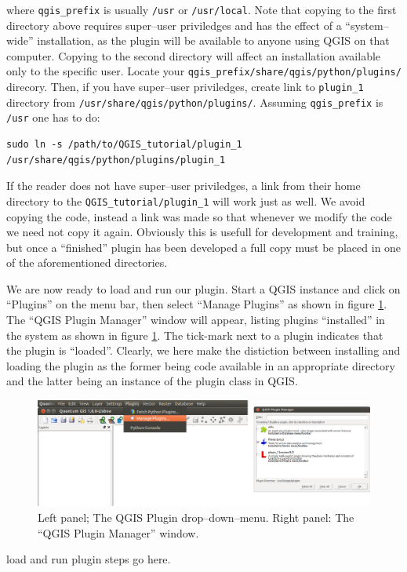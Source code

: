 where  \lstinline{qgis_prefix} is usually \lstinline{/usr} or \lstinline{/usr/local}. Note that copying to the first directory above requires super--user priviledges and has the effect of a ``system--wide'' installation, as the plugin will be available to anyone using QGIS on that computer. Copying to the second directory will affect an installation available only to the specific user. Locate your \lstinline{qgis_prefix/share/qgis/python/plugins/} direcory. Then, if you have super--user priviledges, create link to \lstinline{plugin_1} directory from \lstinline{/usr/share/qgis/python/plugins/}. Assuming \lstinline{qgis_prefix} is \lstinline{/usr} one has to do:
\begin{lstlisting}
sudo ln -s /path/to/QGIS_tutorial/plugin_1 /usr/share/qgis/python/plugins/plugin_1
\end{lstlisting}
If the reader does not have super--user priviledges, a link from their home directory to the \lstinline{QGIS_tutorial/plugin_1} will work just as well. We avoid copying the code, instead a link was made so that whenever we modify the code we need not copy it again. Obviously this is usefull for development and training, but once a ``finished'' plugin has been developed a full copy must be placed in one of the aforementioned directories.
\par%
We are now ready to load and run our plugin. Start a QGIS instance and click on ``Plugins'' on the menu bar, then select ``Manage Plugins'' as shown in figure \ref{fig:loading_QGIS_plugins}. The ``QGIS Plugin Manager'' window will appear, listing plugins ``installed'' in the system as shown in figure \ref{fig:loading_QGIS_plugins}. The tick-mark next to a plugin indicates that the plugin is ``loaded''. Clearly, we here make the distiction between installing and loading the plugin as the former being code available in an appropriate directory and the latter being an instance of the plugin class in QGIS.
\begin{figure}
 \centering
 \includegraphics[width=\textwidth]{figures/loading_QGIS_plugins.png}
 \caption{Left panel; The QGIS Plugin drop--down--menu. Right panel: The ``QGIS Plugin Manager'' window.}
 \label{fig:loading_QGIS_plugins}
\end{figure}
load and run plugin steps go here.


